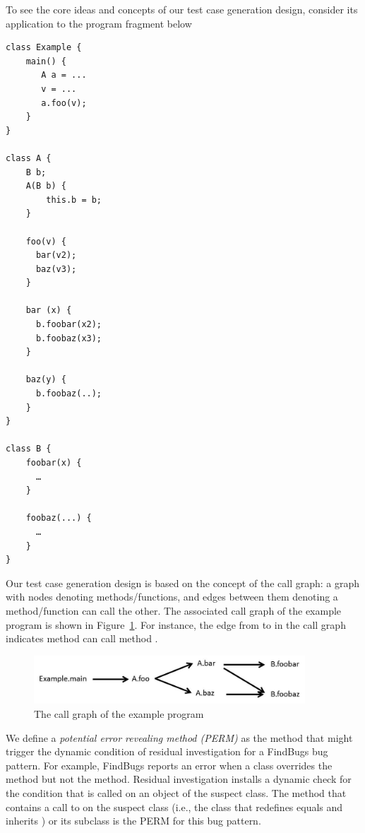 To see the core ideas and concepts of our test case generation design, consider its application to the program fragment below

\begin{lstlisting}[style=JavaStyle, caption=Simple example program fragment, label=lst:example, frame=none]
class Example {
	main() {
	   A a = ...
	   v = ...
	   a.foo(v);
	}
}

class A {
	B b;
	A(B b) {
		this.b = b;
	}

	foo(v) {
	  bar(v2);
	  baz(v3);
	}

	bar (x) {
	  b.foobar(x2);
	  b.foobaz(x3);
	}

	baz(y) {
	  b.foobaz(..);
	}
}

class B {
	foobar(x) {
	  …
	}

	foobaz(...) {
	  …
	}
}
\end{lstlisting}

Our test case generation design is based on the concept of the call graph: a graph with nodes denoting methods/functions, and edges between them denoting a method/function can call the other.  The associated call graph of the example program is shown in Figure~\ref{fig:call-graph-example}.  For instance, the edge from  to  in the call graph indicates method  can call method . 

\begin{figure}[h]
\centering
\includegraphics[width=4.0in, trim=0in 0in 0in 0in, clip]{call_graph.jpg}
\caption{The call graph of the example program}
\label{fig:call-graph-example}
\end{figure}

We define a \emph{potential error revealing method (PERM)} as the method that might trigger the dynamic condition of residual investigation for a FindBugs bug pattern.  For example, FindBugs reports an error when a class overrides the  method but not the  method.  Residual investigation installs a dynamic check for the condition that  is called on an object of the suspect class. The method that contains a call to  on the suspect class (i.e., the class that redefines equals and inherits ) or its subclass is the PERM for this bug pattern.  

